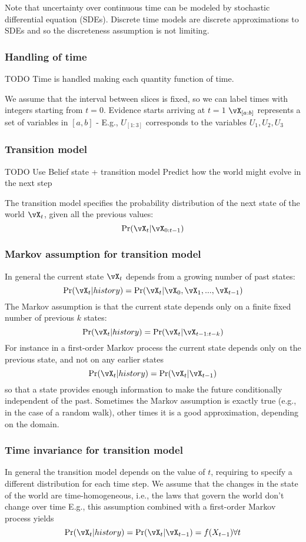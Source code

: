 \documentclass[11pt, reqno]{amsart}
\theoremstyle{definition}
\theoremstyle{remark}
\begin{document}
  Note that uncertainty over continuous time can be modeled by stochastic
  differential equation (SDEs). Discrete time models are discrete
  approximations to SDEs and so the discreteness assumption is not limiting.

  \subsubsection{Handling of time}
  TODO
  Time is handled making each quantity function of time.

  We assume that the interval between slices is fixed, so we can label times
  with integers starting from $t = 0$. Evidence starts arriving at $t = 1$
  $\vX_{[a:b]}$ represents a set of variables in $[a, b]$
  - E.g., $U_{[1:3]}$ corresponds to the variables $U_1, U_2, U_3$

  \subsubsection{Transition model}
  TODO
  Use Belief state + transition model Predict how the world might evolve in the next step

  The transition model specifies the probability distribution of the next state of
  the world $\vX_t$, given all the previous
  values:
  $$
  \Pr(\vX_t | \vX_{0:t-1})
  $$

  \subsubsection{Markov assumption for transition model}
  In general the current state $\vX_t$ depends from a growing number of past
  states:
  $$
  \Pr(\vX_t | history) = \Pr(\vX_t | \vX_0, \vX_1, ..., \vX_{t-1})
  $$
  The Markov assumption is that the current state depends only on a finite fixed
  number of previous $k$ states:
  $$
  \Pr(\vX_t | history) = \Pr(\vX_t | \vX_{t-1:t-k})
  $$
  For instance in a first-order Markov process the current state depends only
  on the previous state, and not on any earlier states
  $$
  \Pr(\vX_t | history) = \Pr(\vX_t | \vX_{t-1})
  $$
  so that a state provides enough information to make the future conditionally
  independent of the past.
  Sometimes the Markov assumption is exactly true (e.g., in the case of a
  random walk), other times it is a good approximation, depending on the
  domain.

  \subsubsection{Time invariance for transition model}
  In general the transition model depends on the value of $t$, requiring to
  specify a different distribution for each time step.
  We assume that the changes in the state of the world are time-homogeneous,
  i.e., the laws that govern the world don't change over time
  E.g., this assumption combined with a first-order Markov process yields
  $$
  \Pr(\vX_t | history) = \Pr(\vX_t | \vX_{t-1}) = f(X_{t-1}) \forall t
  $$
\end{document}
